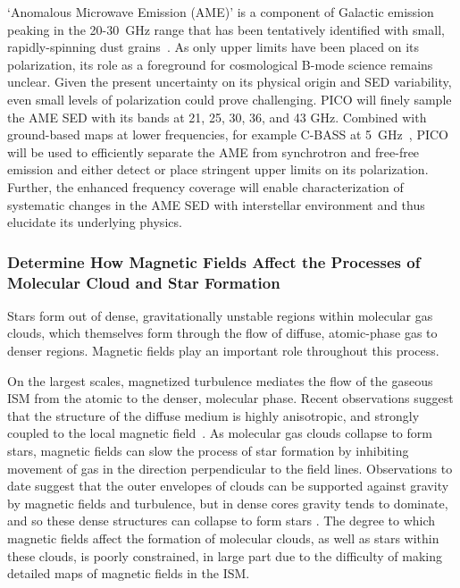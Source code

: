 \documentclass[PICOReport.tex]{subfiles}
\begin{document}
`Anomalous Microwave Emission (AME)' is a component of Galactic emission peaking in the 20-30~GHz range that has been tentatively identified with small, rapidly-spinning dust grains~\citep{dickinson/etal:2018}. As only upper limits have been placed on its polarization, its role as a foreground for cosmological B-mode science remains unclear. Given the present uncertainty on its physical origin and SED variability, even small levels of polarization could prove challenging. PICO will finely sample the AME SED with its bands at 21, 25, 30, 36, and 43 GHz. Combined with ground-based maps at lower frequencies, for example C-BASS at 5~GHz~\citep{Dickinson2018a}, PICO will be used to efficiently separate the AME from synchrotron and free-free emission and either detect or place stringent upper limits on its polarization. Further, the enhanced frequency coverage will enable characterization of systematic changes in the AME SED with interstellar environment and thus elucidate its underlying physics.

\subsubsection{Determine How Magnetic Fields Affect the Processes of Molecular Cloud and Star Formation}
\label{sec:magnetic_fields}

Stars form out of dense, gravitationally unstable regions within molecular gas clouds, which themselves form through the flow of diffuse, atomic-phase gas to denser regions. Magnetic fields play an important role throughout this process. 

On the largest scales, magnetized turbulence mediates the flow of the gaseous \ac{ISM} from the atomic to the denser, molecular phase. Recent observations suggest that the structure of the diffuse medium is highly anisotropic, and strongly coupled to the local magnetic field~\citep{Clark:2014, Clark:2015, Kalberla:2016, KalberlaKerp:2016}. As molecular gas clouds collapse to form stars, magnetic fields can slow the process of star formation by inhibiting movement of gas in the direction perpendicular to the field lines. Observations to date suggest that the outer envelopes of clouds can be supported against gravity by magnetic fields and turbulence, but in dense cores gravity tends to dominate, and so these dense structures can collapse to form stars \citep{Crutcher2010}.  The degree to which magnetic fields affect the formation of molecular clouds, as well as stars within these clouds, is poorly constrained, in large part due to the difficulty of making detailed maps of magnetic fields in the ISM.
\end{document}
